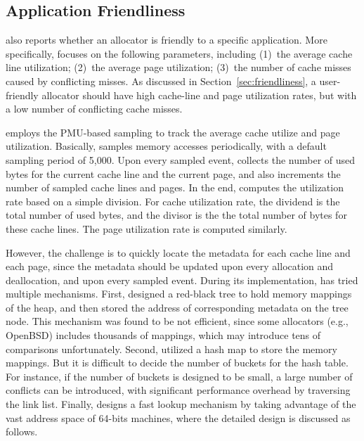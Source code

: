 

\subsection{Application Friendliness}
\label{sec:profilefriendliness}

\MP{} also reports whether an allocator is friendly to a specific application. More specifically, \MP{} focuses on the following parameters, including (1)~the average cache line utilization; (2)~the average page utilization; (3)~the number of cache misses caused by conflicting misses. As discussed in Section~\ref{sec:friendliness}, a user-friendly allocator should have  high cache-line and page utilization rates, but with a low number of conflicting cache misses.  

\MP{} employs the PMU-based sampling to track the average cache utilize and page utilization. Basically, \MP{} samples memory accesses periodically, with a default sampling period of 5,000. Upon every sampled event, \MP{} collects the number of used bytes for the current cache line and the current page, and also increments the number of sampled cache lines and pages. In the end, \MP{} computes the utilization rate  based on a simple division. For cache utilization rate, the dividend is the total number of used bytes, and the divisor is the the total number of bytes for these cache lines. The page utilization rate is computed similarly. 

However, the challenge is to quickly locate the  metadata for each cache line and each page, since the metadata should be updated upon every allocation and deallocation, and upon every sampled event. During its implementation, \MP{} has tried multiple mechanisms. First, \MP{} designed a red-black tree to hold memory mappings of the heap, and then stored the address of corresponding metadata on the tree node. This mechanism was found to be not efficient, since some allocators (e.g., OpenBSD) includes thousands of mappings, which may introduce tens of comparisons unfortunately. Second, \MP{} utilized a hash map to store the memory mappings. But it is difficult to decide the number of buckets for the hash table. For instance, if the number of buckets is designed to be small,  a large number of conflicts can be introduced, with significant performance overhead by traversing the link list.  Finally, \MP{} designs a fast lookup mechanism by taking advantage of the vast address space of 64-bits machines, where the detailed design is discussed as follows. 

